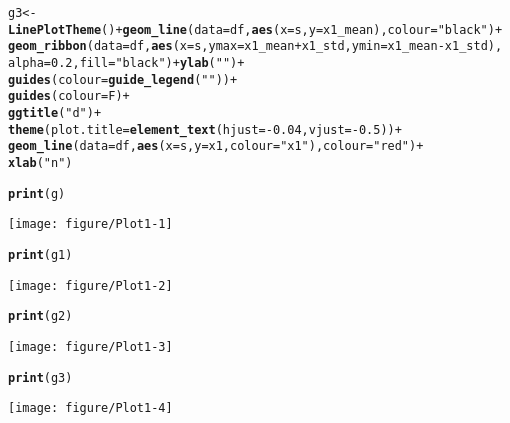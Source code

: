 \documentclass{article}\usepackage[]{graphicx}\usepackage[]{color}
\makeatletter
\def\maxwidth{ %
  \ifdim\Gin@nat@width>\linewidth
    \linewidth
  \else
    \Gin@nat@width
  \fi
}
\newcommand{\hlnum}[1]{\textcolor[rgb]{0.686,0.059,0.569}{#1}}%
\newcommand{\hlstr}[1]{\textcolor[rgb]{0.192,0.494,0.8}{#1}}%
\newcommand{\hlopt}[1]{\textcolor[rgb]{0,0,0}{#1}}%
\newcommand{\hlstd}[1]{\textcolor[rgb]{0.345,0.345,0.345}{#1}}%
\newcommand{\hlkwb}[1]{\textcolor[rgb]{0.69,0.353,0.396}{#1}}%
\newcommand{\hlkwc}[1]{\textcolor[rgb]{0.333,0.667,0.333}{#1}}%
\newcommand{\hlkwd}[1]{\textcolor[rgb]{0.737,0.353,0.396}{\textbf{#1}}}%
\newenvironment{kframe}{%
 \def\at@end@of@kframe{}%
 \ifinner\ifhmode%
  \def\at@end@of@kframe{\end{minipage}}%
  \begin{minipage}{\columnwidth}%
 \fi\fi%
 \def\FrameCommand##1{\hskip\@totalleftmargin \hskip-\fboxsep
 \colorbox{shadecolor}{##1}\hskip-\fboxsep
     \hskip-\linewidth \hskip-\@totalleftmargin \hskip\columnwidth}%
 \MakeFramed {\advance\hsize-\width
   \@totalleftmargin\z@ \linewidth\hsize
   \@setminipage}}%
 {\par\unskip\endMakeFramed%
 \at@end@of@kframe}
\newenvironment{knitrout}{}{} %
\makeatother
\begin{document}
\begin{knitrout}
\begin{kframe}
\begin{alltt}
\hlstd{g3} \hlkwb{<-} \hlkwd{LinePlotTheme}\hlstd{()} \hlopt{+} \hlkwd{geom_line}\hlstd{(}\hlkwc{data}\hlstd{=df,}\hlkwd{aes}\hlstd{(}\hlkwc{x}\hlstd{=s,}\hlkwc{y}\hlstd{=x1_mean),}\hlkwc{colour}\hlstd{=}\hlstr{"black"}\hlstd{)} \hlopt{+}
  \hlkwd{geom_ribbon}\hlstd{(}\hlkwc{data}\hlstd{=df,}\hlkwd{aes}\hlstd{(}\hlkwc{x}\hlstd{=s,} \hlkwc{ymax} \hlstd{= x1_mean} \hlopt{+} \hlstd{x1_std,} \hlkwc{ymin} \hlstd{= x1_mean}\hlopt{-}\hlstd{x1_std),}
              \hlkwc{alpha}\hlstd{=}\hlnum{0.2}\hlstd{,}\hlkwc{fill}\hlstd{=}\hlstr{"black"}\hlstd{)} \hlopt{+} \hlkwd{ylab}\hlstd{(}\hlstr{""}\hlstd{)} \hlopt{+}
  \hlkwd{guides}\hlstd{(}\hlkwc{colour}\hlstd{=}\hlkwd{guide_legend}\hlstd{(}\hlstr{""}\hlstd{))}  \hlopt{+}
  \hlkwd{guides}\hlstd{(}\hlkwc{colour}\hlstd{=F)} \hlopt{+}
  \hlkwd{ggtitle}\hlstd{(}\hlstr{"d"}\hlstd{)} \hlopt{+}
  \hlkwd{theme}\hlstd{(}\hlkwc{plot.title} \hlstd{=} \hlkwd{element_text}\hlstd{(}\hlkwc{hjust} \hlstd{=} \hlopt{-}\hlnum{0.04}\hlstd{,}\hlkwc{vjust}\hlstd{=}\hlopt{-}\hlnum{0.5}\hlstd{))} \hlopt{+}
  \hlkwd{geom_line}\hlstd{(}\hlkwc{data}\hlstd{=df,}\hlkwd{aes}\hlstd{(}\hlkwc{x}\hlstd{=s,}\hlkwc{y}\hlstd{=x1,}\hlkwc{colour}\hlstd{=}\hlstr{"x1"}\hlstd{),}\hlkwc{colour}\hlstd{=}\hlstr{"red"}\hlstd{)} \hlopt{+}
  \hlkwd{xlab}\hlstd{(}\hlstr{"n"}\hlstd{)}
\end{alltt}
\end{kframe}
\end{knitrout}

\begin{knitrout}
\color{fgcolor}\begin{kframe}
\begin{alltt}
\hlkwd{print}\hlstd{(g)}
\end{alltt}
\end{kframe}
\texttt{[image: figure/Plot1-1]} 
\begin{kframe}\begin{alltt}
\hlkwd{print}\hlstd{(g1)}
\end{alltt}
\end{kframe}
\texttt{[image: figure/Plot1-2]} 
\begin{kframe}\begin{alltt}
\hlkwd{print}\hlstd{(g2)}
\end{alltt}
\end{kframe}
\texttt{[image: figure/Plot1-3]} 
\begin{kframe}\begin{alltt}
\hlkwd{print}\hlstd{(g3)}
\end{alltt}
\end{kframe}
\texttt{[image: figure/Plot1-4]} 

\end{knitrout}


\end{document}
